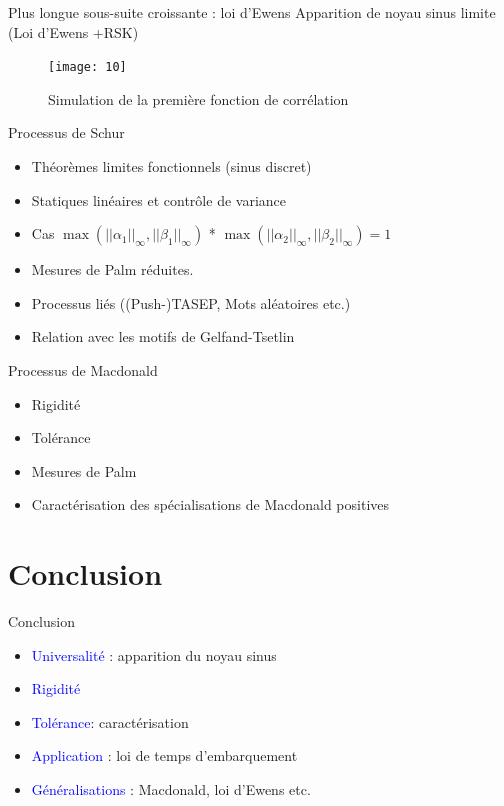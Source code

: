 \documentclass[french]{beamer}
\begin{document}
\begin{frame}{Plus longue sous-suite croissante : loi d’Ewens}
Apparition de noyau sinus limite (Loi d’Ewens +RSK)
\begin{figure}[ht]
    \centering
  \texttt{[image: 10]}
\caption {Simulation de la première fonction de corrélation}
\end{figure}

\end{frame}

\begin{frame}{Processus de Schur}
\begin{itemize}
\item  Théorèmes limites fonctionnels (sinus discret)
\item  Statiques linéaires et contrôle de variance
\item Cas $\max
 (||\alpha_1||_\infty,||\beta_1||_\infty)$ * $\max
 (||\alpha_2||_\infty,||\beta_2||_\infty) =1 $
\item Mesures de Palm réduites.
\item Processus liés ((Push-)TASEP, Mots aléatoires etc.)
\item Relation avec les motifs de Gelfand-Tsetlin
\end{itemize}
\end{frame}

\begin{frame}{Processus de Macdonald}

\begin{itemize}
\item  Rigidité
\item  Tolérance
\item  Mesures de Palm
\item Caractérisation des spécialisations de Macdonald positives 
\end{itemize}
\end{frame}

\section*{Conclusion}
\begin{frame}{Conclusion}
\begin{itemize}
\item \textcolor{blue}{ Universalité} : apparition du noyau sinus 
\item \textcolor{blue}{Rigidité}
\item \textcolor{blue}{Tolérance}: caractérisation 
\item \textcolor{blue}{Application} : loi de temps d'embarquement 
\item \textcolor{blue}{Généralisations} : Macdonald, loi d'Ewens  etc.
\end{itemize}
\end{frame}
\end{document}
